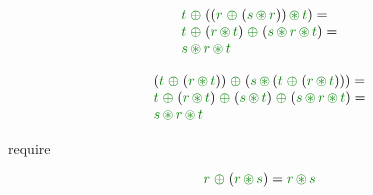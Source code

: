 \begin{equation*}
\begin{array}{l}
  \cclrd{t}
  \;\cpar\;
  (  (\cclrd{r}\;\cpar\;(\cclrd{s}\,\cseq\,\cclrd{r}))
     \,\cseq\, 
     \cclrd{t} ) = 
\\
  \cclrd{t}
  \;\cpar\;
  (\cclrd{r}\,\cseq\, \cclrd{t})
  \;\cpar\;
  (\cclrd{s}\,\cseq\,\cclrd{r}\,\cseq\, \cclrd{t}) = 
\\
  \cclrd{s}\,\cseq\,\cclrd{r}\,\cseq\, \cclrd{t} 
\end{array}
\end{equation*}

\begin{equation*}
\begin{array}{l}
  (\cclrd{t}\;\cpar\;(\cclrd{r}\,\cseq\,\cclrd{t})) 
  \;\cpar\;
  (  \cclrd{s}
     \,\cseq\, 
     (\cclrd{t}\;\cpar\;(\cclrd{r}\,\cseq\,\cclrd{t})) ) = 
\\     
  \cclrd{t}\;\cpar\;(\cclrd{r}\,\cseq\,\cclrd{t})
  \;\cpar\;
  (\cclrd{s} \,\cseq\, \cclrd{t})
  \;\cpar\;
  (\cclrd{s} \,\cseq\, \cclrd{r}\,\cseq\,\cclrd{t})  = 
\\     
  \cclrd{s} \,\cseq\, \cclrd{r}\,\cseq\,\cclrd{t}
\end{array}
\end{equation*}

require

\begin{equation*}
\cclrd{r}\;\cpar\;(\cclrd{r} \,\cseq\, \cclrd{s}) = \cclrd{r} \,\cseq\, \cclrd{s}
\end{equation*}
